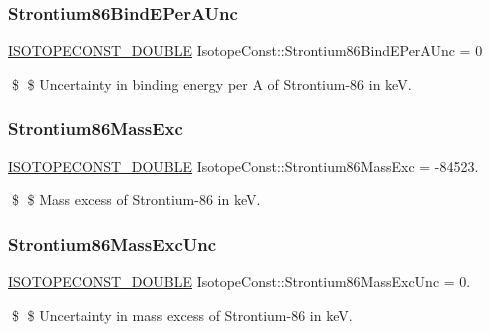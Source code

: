 \subsubsection{\texorpdfstring{Strontium86\+Bind\+E\+Per\+A\+Unc}{Strontium86BindEPerAUnc}}
{\footnotesize\ttfamily \mbox{\hyperlink{group___isotope_const-_macros_ga8f45a7272ce02c0b4c65c44636ed719a}{I\+S\+O\+T\+O\+P\+E\+C\+O\+N\+S\+T\+\_\+\+D\+O\+U\+B\+LE}} Isotope\+Const\+::\+Strontium86\+Bind\+E\+Per\+A\+Unc = 0}

\$ \$ Uncertainty in binding energy per A of Strontium-\/86 in keV. \mbox{\label{group___isotope_const-_strontium-_sr86_ga1d3e0e22d82f2bf56264d24613147ced}} 
\subsubsection{\texorpdfstring{Strontium86\+Mass\+Exc}{Strontium86MassExc}}
{\footnotesize\ttfamily \mbox{\hyperlink{group___isotope_const-_macros_ga8f45a7272ce02c0b4c65c44636ed719a}{I\+S\+O\+T\+O\+P\+E\+C\+O\+N\+S\+T\+\_\+\+D\+O\+U\+B\+LE}} Isotope\+Const\+::\+Strontium86\+Mass\+Exc = -\/84523.}

\$ \$ Mass excess of Strontium-\/86 in keV. \mbox{\label{group___isotope_const-_strontium-_sr86_gad251e5167dc9f260ab971bf2012469c7}} 
\subsubsection{\texorpdfstring{Strontium86\+Mass\+Exc\+Unc}{Strontium86MassExcUnc}}
{\footnotesize\ttfamily \mbox{\hyperlink{group___isotope_const-_macros_ga8f45a7272ce02c0b4c65c44636ed719a}{I\+S\+O\+T\+O\+P\+E\+C\+O\+N\+S\+T\+\_\+\+D\+O\+U\+B\+LE}} Isotope\+Const\+::\+Strontium86\+Mass\+Exc\+Unc = 0.}

\$ \$ Uncertainty in mass excess of Strontium-\/86 in keV. \mbox{\label{group___isotope_const-_strontium-_sr86_ga35dc668ee2cff36ef48bddb7ecc44f17}} 
